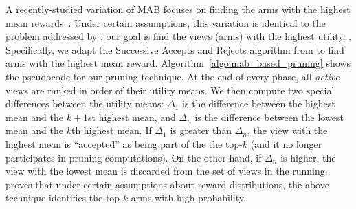 A recently-studied variation of MAB focuses on finding the arms with the highest
mean rewards~\cite{BubeckWV13, audibert2010best}.
Under certain  assumptions, this variation is identical to the problem addressed by \SeeDB: our goal is find the views (arms) with the 
highest utility. .
Specifically, we adapt the Successive Accepts and Rejects algorithm from \cite{BubeckWV13} 
to find arms with the highest mean reward. 
Algorithm~\ref{algo:mab_based_pruning} shows the pseudocode for our pruning technique.
At the end of every phase, all {\it active} views are ranked in order of their utility means. 
We then compute two special differences between the utility means: $\Delta_1$
is the difference between the highest mean and the $k+1$st highest mean, and
$\Delta_n$ is the difference between the lowest mean and the $k$th highest mean.
If $\Delta_1$ is greater than $\Delta_n$, the view with the highest mean is
``accepted'' as being part of the the top-$k$ (and it no longer participates
in pruning computations).
On the other hand, if $\Delta_n$ is higher, the view with the lowest mean is discarded
from the set of views in the running.
\cite{BubeckWV13} proves that under certain assumptions about reward distributions,
the above technique identifies the top-$k$ arms with high probability.


